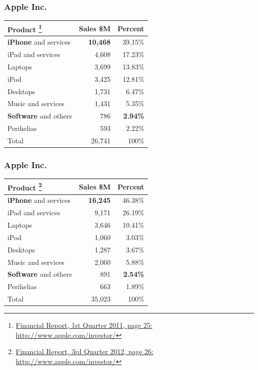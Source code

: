 \documentclass[18pt]{beamer}
\begin{document}
{
\begin{frame}
\frametitle{Apple Inc.}

\begin{center}
\begin{tabular}{lrr}
\hline
\textbf{Product}
\footnote{
\href{http://phx.corporate-ir.net/External.File?item=UGFyZW50SUQ9NzgwODJ8Q2hpbGRJRD0tMXxUeXBlPTM=&t=1}
{Financial Report, 1st Quarter 2011, page 25:}
 \url{http://www.apple.com/investor/} }
& \textbf{Sales \$M}
& \textbf{Percent} \\
\hline
\hline
\textbf{iPhone} and services & \textbf{10,468} &  39.15\%  \\
iPad and services & 4,608 & 17.23\% \\
Laptops & 3,699 & 13.83\% \\
iPod & 3,425 & 12.81\% \\
Desktops & 1,731 & 6.47\% \\
Music and services & 1,431 & 5.35\%  \\
\textbf{Software} and others &  786 & \textbf{2.94\%} \\
Perihelias &  593 & 2.22\% \\
\hline
Total &  26,741 & 100\% \\
\end{tabular}

\end{center}
\end{frame}
}


{
\begin{frame}
\frametitle{Apple Inc.}

\begin{center}
\begin{tabular}{lrr}
\hline
\textbf{Product}
\footnote{
\href{http://files.shareholder.com/downloads/AAPL/2036902658x0x585701/beacb369-cb95-4950-acf4-4fbfa3569ec6/Q3\_2012\_Form\_10-Q\_As-Filed\_.pdf}
{Financial Report, 3rd Quarter 2012, page 26:}
 \url{http://www.apple.com/investor/} }
& \textbf{Sales \$M}
& \textbf{Percent} \\
\hline
\hline
\textbf{iPhone} and services & \textbf{16,245} &  46.38\%  \\
iPad and services & 9,171 & 26.19\% \\
Laptops & 3,646 & 10.41\% \\
iPod & 1,060 & 3.03\% \\
Desktops & 1,287 & 3.67\% \\
Music and services & 2,060 & 5.88\%  \\
\textbf{Software} and others &  891 & \textbf{2.54\%} \\
Perihelias &  663 & 1.89\% \\
\hline
Total &  35,023 & 100\% \\
\end{tabular}

\end{center}
\end{frame}
}
\end{document}
